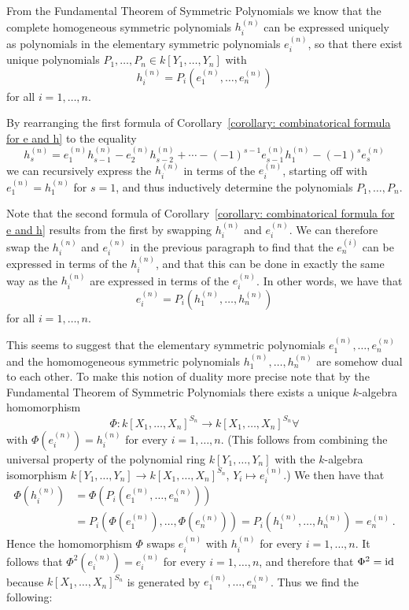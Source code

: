 \begin{fluff}
  From the Fundamental Theorem of Symmetric Polynomials we know that the complete homogeneous symmetric polynomials $h^{(n)}_i$ can be expressed uniquely as polynomials in the elementary symmetric polynomials $e^{(n)}_i$, so that there exist unique polynomials $P_1, \dotsc, P_n \in k[Y_1, \dotsc, Y_n]$ with
  \[
      h^{(n)}_i
    = P_i\left( e^{(n)}_1, \dotsc, e^{(n)}_n \right)
  \]
  for all $i = 1, \dotsc, n$.
  
  By rearranging the first formula of Corollary~\ref{corollary: combinatorical formula for e and h} to the equality
  \[
      h^{(n)}_s
    =   e^{(n)}_1 h^{(n)}_{s-1}
      - e^{(n)}_2 h^{(n)}_{s-2}
      + \dotsb
      - (-1)^{s-1} e^{(n)}_{s-1} h^{(n)}_1
      - (-1)^s e^{(n)}_s
  \]
  we can recursively express the $h^{(n)}_i$ in terms of the $e^{(n)}_i$, starting off with $e^{(n)}_1 = h^{(n)}_1$ for $s = 1$, and thus inductively determine the polynomials $P_1, \dotsc, P_n$.
  
  Note that the second formula of Corollary~\ref{corollary: combinatorical formula for e and h} results from the first by swapping $h^{(n)}_i$ and $e^{(n)}_i$.
  We can therefore swap the $h^{(n)}_i$ and $e^{(n)}_i$ in the previous paragraph to find that the $e^{(i)}_n$ can be expressed in terms of the $h^{(n)}_i$, and that this can be done in exactly the same way as the $h^{(n)}_i$ are expressed in terms of the $e^{(n)}_i$.
  In other words, we have that
  \[
      e^{(n)}_i
    = P_i\left( h^{(n)}_1, \dotsc, h^{(n)}_n \right)
  \]
  for all $i = 1, \dotsc, n$.
  
  This seems to suggest that the elementary symmetric polynomials $e^{(n)}_1, \dotsc, e^{(n)}_n$ and the homomogeneous symmetric polynomials $h^{(n)}_1, \dotsc, h^{(n)}_n$ are somehow dual to each other.
  To make this notion of duality more precise note that by the Fundamental Theorem of Symmetric Polynomials there exists a unique $k$-algebra homomorphism
  \[
            \Phi
    \colon  k[X_1, \dotsc, X_n]^{S_n}
    \to     k[X_1, \dotsc, X_n]^{S_n}∀
  \]
  with $\Phi(e^{(n)}_i) = h^{(n)}_i$ for every $i = 1, \dotsc, n$.
  (This follows from combining the universal property of the polynomial ring $k[Y_1, \dotsc, Y_n]$ with the $k$-algebra isomorphism $k[Y_1, \dotsc, Y_n] \to k[X_1, \dotsc, X_n]^{S_n}$, $Y_i \mapsto e^{(n)}_i$.)
  We then have that
  \begin{align*}
        \Phi\left( h^{(n)}_i \right)
    &=  \Phi
        \left(
          P_i\left(
            e^{(n)}_1,
            \dotsc,
            e^{(n)}_n \right)
        \right) \\
    &=  P_i\left(
          \Phi\left(e^{(n)}_1\right),
          \dotsc,
          \Phi\left(e^{(n)}_n\right)
        \right)
      = P_i
        \left(
          h^{(n)}_1, \dotsc, h^{(n)}_n
        \right)
      = e^{(n)}_n \,.
  \end{align*}
  Hence the homomorphism $\Phi$ swaps $e^{(n)}_i$ with $h^{(n)}_i$ for every $i = 1, \dotsc, n$.
  It follows that $\Phi^2(e^{(n)}_i) = e^{(n)}_i$ for every $i = 1, \dotsc, n$, and therefore that $\Phi^2 = \operatorname{id}$ because $k[X_1, \dotsc, X_n]^{S_n}$ is generated by $e^{(n)}_1, \dotsc, e^{(n)}_n$.
  Thus we find the following:
\end{fluff}


